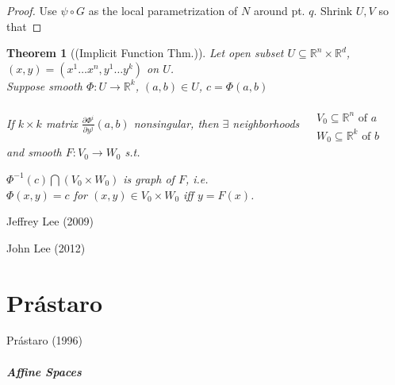 \documentclass[10pt]{amsart}
\newtheorem{theorem}{Theorem}
\begin{document}
\begin{multicols*}{2}
\begin{proof}
Use $\psi \circ G$ as the local parametrization of $N$ around pt. $q$.  Shrink $U,V$ so that 


\end{proof}






\begin{theorem}[(Implicit Function Thm.)]
  Let open subset $U\subseteq \mathbb{R}^n \times \mathbb{R}^d$, $(x,y) = (x^1 \dots x^n, y^1 \dots y^k) $ on $U$.  \\
  Suppose smooth $\Phi:U\to \mathbb{R}^k$, $(a,b) \in U$, $c=\Phi(a,b)$

  If $k\times k$ matrix $\frac{ \partial \Phi^i}{ \partial y^j}(a,b)$ nonsingular, then $\exists $ neighborhoods $\begin{aligned} & \quad \\
    & V_0 \subseteq \mathbb{R}^n \text{ of $a$ } \\
    & W_0 \subseteq \mathbb{R}^k \text{ of $b$ } \end{aligned}$ and smooth $F:V_0 \to W_0$ s.t.

  $\Phi^{-1}(c) \bigcap (V_0\times W_0)$ is graph of $F$, i.e. \\
  $\Phi(x,y) =c$ for $(x,y) \in V_0\times W_0$ iff $y=F(x)$.  
  \end{theorem}



Jeffrey Lee (2009) \cite{JLee2009}



John Lee (2012) \cite{JLee2012}


\part{Pr\'{a}staro}

Pr\'{a}staro (1996) \cite{Pras1996}

\subsubsection{Affine Spaces}


\end{multicols*}
\end{document}
